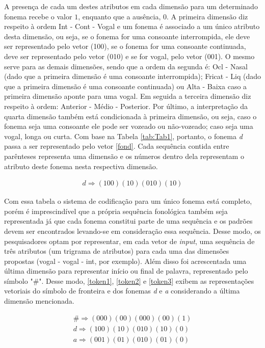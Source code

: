 A presença de cada um destes atributos em cada dimensão para um determinado fonema recebe o valor $1$, enquanto que a ausência, $0$. A primeira dimensão diz respeito à ordem Int - Cont - Vogal e um fonema é associado a um único atributo desta dimensão, ou seja, se o fonema for uma consoante interrompida, ele deve ser representado pelo vetor (100), se o fonema for uma consoante continuada, deve ser representado pelo vetor (010) e se for vogal, pelo vetor (001). O mesmo serve para as demais dimensões, sendo que a ordem da segunda é: Ocl - Nasal (dado que a primeira dimensão é uma consoante interrompida); Fricat - Liq (dado que a primeira dimensão é uma consoante continuada) ou Alta - Baixa caso a primeira dimensão aponte para uma vogal. Em seguida a terceira dimensão diz respeito à ordem: Anterior - Médio - Posterior. Por último, a interpretação da quarta dimensão também está condicionada à primeira dimensão, ou seja, caso o fonema seja uma consoante ele pode ser vozeado ou não-vozeado; caso seja uma vogal, longa ou curta. 
Com base na Tabela \ref{tab:Tab1}, portanto, o fonema \textit{d} passa a ser representado pelo vetor \ref{fond}. Cada sequência contida entre parênteses representa uma dimensão e os números dentro dela representam o atributo deste fonema nesta respectiva dimensão.

\begin{align}
d \Rightarrow (100)(10)(010)(10)\label{fond}
\end{align}

Com essa tabela o sistema de codificação para um único fonema está completo, porém é imprescindível que a própria sequência fonológica também seja representada já que cada fonema constitui parte de uma sequência e os padrões devem ser encontrados levando-se em consideração essa sequência. Desse modo, os pesquisadores optam por representar, em cada vetor de \textit{input}, uma sequência de três atributos (um trigrama de atributos) para cada uma das dimensões propostas (vogal - vogal - int, por exemplo). Além disso foi acrescentada uma última dimensão para representar início ou final de palavra, representado pelo símbolo "\#". Desse modo, \ref{token1}, \ref{token2} e \ref{token3} exibem as representações vetoriais do símbolo de fronteira e dos fonemas \textit{d} e \textit{a} considerando a última dimensão mencionada.

\begin{align}
\# \Rightarrow (000)(00)(000)(00)(1)\label{token1}\\
d \Rightarrow (100)(10)(010)(10)(0)\label{token2}\\
a \Rightarrow (001)(01)(010)(01)(0)\label{token3}
\end{align}

